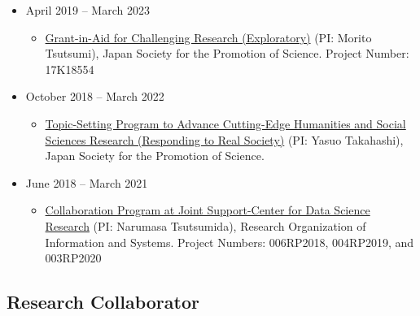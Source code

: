 \documentclass[
]{book}
\providecommand{\tightlist}{%
  \setlength{\itemsep}{0pt}\setlength{\parskip}{0pt}}
\begin{document}
\begin{itemize}
  \begin{itemize}
  \tightlist
  \item
    \href{https://kaken.nii.ac.jp/en/grant/KAKENHI-PROJECT-18H03628/}{Grant-in-Aid for Scientific Research (A)} (PI: Morito Tsutsumi),
    Japan Society for the Promotion of Science.
    Project Number: 18H03628
  \end{itemize}
\item
  April 2019 -- March 2023

  \begin{itemize}
  \tightlist
  \item
    \href{https://kaken.nii.ac.jp/en/grant/KAKENHI-PROJECT-17K18554/}{Grant-in-Aid for Challenging Research (Exploratory)} (PI: Morito Tsutsumi),
    Japan Society for the Promotion of Science.
    Project Number: 17K18554
  \end{itemize}
\item
  October 2018 -- March 2022

  \begin{itemize}
  \tightlist
  \item
    \href{https://www.jsps.go.jp/english/e-kadai/jissyakai/index.html}{Topic-Setting Program to Advance Cutting-Edge Humanities and Social Sciences Research (Responding to Real Society)} (PI: Yasuo Takahashi),
    Japan Society for the Promotion of Science.
  \end{itemize}
\item
  June 2018 -- March 2021

  \begin{itemize}
  \tightlist
  \item
    \href{https://ds.rois.ac.jp/en_crp/en_calling/}{Collaboration Program at Joint Support-Center for Data Science Research} (PI: Narumasa Tsutsumida),
    Research Organization of Information and Systems.
    Project Numbers: 006RP2018, 004RP2019, and 003RP2020
  \end{itemize}
\end{itemize}

\subsection*{Research Collaborator}\label{research-collaborator}
\end{document}
